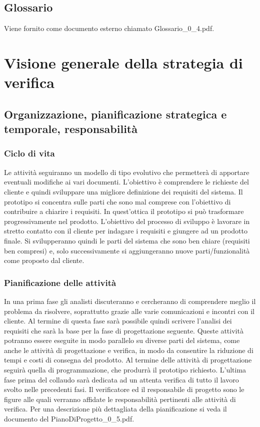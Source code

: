 \documentclass[11pt,titlepage,a4paper]{report}
\begin{document}
\section{Glossario}
Viene fornito come documento esterno chiamato Glossario\_0\_4.pdf.

\chapter[Strategia di verifica]{Visione generale della strategia di verifica}

\section[Organizzazione, pianificazione, responsabilit\`a]{Organizzazione, pianificazione strategica e temporale, responsabilit\`a}
\subsection{Ciclo di vita}
Le attivit\`a seguiranno un modello di tipo evolutivo che permetter\`a di apportare eventuali modifiche ai vari documenti. L'obiettivo \`e comprendere le richieste del cliente e quindi sviluppare una migliore definizione dei requisiti del sistema. Il prototipo si concentra sulle parti che sono mal comprese con l'obiettivo di contribuire a chiarire i requisiti. In quest'ottica il prototipo si pu\`o trasformare progressivamente nel prodotto. L'obiettivo del processo di sviluppo \`e lavorare in stretto contatto con il cliente per indagare i requisiti e giungere ad un prodotto finale. Si svilupperanno quindi le parti del sistema che sono ben chiare (requisiti ben compresi) e, solo successivamente si aggiungeranno nuove parti/funzionalit\`a come proposto dal cliente. 
\subsection{Pianificazione delle attivit\`a}
In una prima fase gli analisti discuteranno e cercheranno di comprendere meglio il problema da risolvere, soprattutto grazie alle varie comunicazioni e incontri con il cliente. Al termine di questa fase sar\`a possibile quindi scrivere l'analisi dei requisiti che sar\`a la base per la fase di progettazione seguente. Queste attivit\`a potranno essere eseguite in modo parallelo su diverse parti del sistema, come anche le attivit\`a di progettazione e verifica, in modo da consentire la riduzione di tempi e costi di consegna del prodotto. Al termine delle attivit\`a di progettazione seguir\`a quella di programmazione, che produrr\`a il prototipo richiesto. L'ultima fase prima del collaudo sar\`a dedicata ad un attenta verifica di tutto il lavoro svolto nelle precedenti fasi. Il verificatore ed il responsabile di progetto sono le figure alle quali verranno affidate le responsabilit\`a pertinenti alle attivit\`a di verifica. Per una descrizione pi\`u dettagliata della pianificazione si veda il documento del PianoDiProgetto\_0\_5.pdf.
\end{document}
